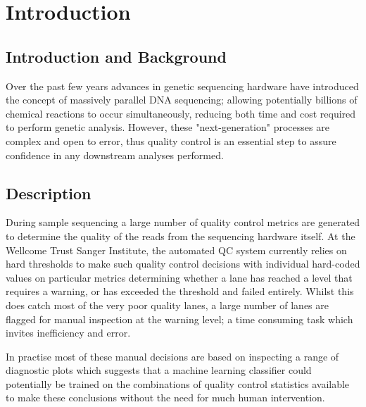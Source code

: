 \chapter{Introduction}


\section{Introduction and Background}
Over the past few years advances in genetic sequencing hardware have introduced the concept of massively parallel DNA sequencing; allowing potentially billions of chemical reactions to occur simultaneously, reducing both time and cost required to perform genetic analysis\citep{HMG}. However, these "next-generation" processes are complex and open to error\citep{Illumina}, thus quality control is an essential step to assure confidence in any downstream analyses performed.


\section{Description}
During sample sequencing a large number of quality control metrics are generated to determine the quality of the reads from the sequencing hardware itself. At the Wellcome Trust Sanger Institute, the automated QC system currently relies on hard thresholds to make such quality control decisions with individual hard-coded values on particular metrics determining whether a lane has reached a level that requires a warning, or has exceeded the threshold and failed entirely. Whilst this does catch most of the very poor quality lanes, a large number of lanes are flagged for manual inspection at the warning level; a time consuming task which invites inefficiency and error.

In practise most of these manual decisions are based on inspecting a range of diagnostic plots which suggests that a machine learning classifier could potentially be trained on the combinations of quality control statistics available to make these conclusions without the need for much human intervention.


